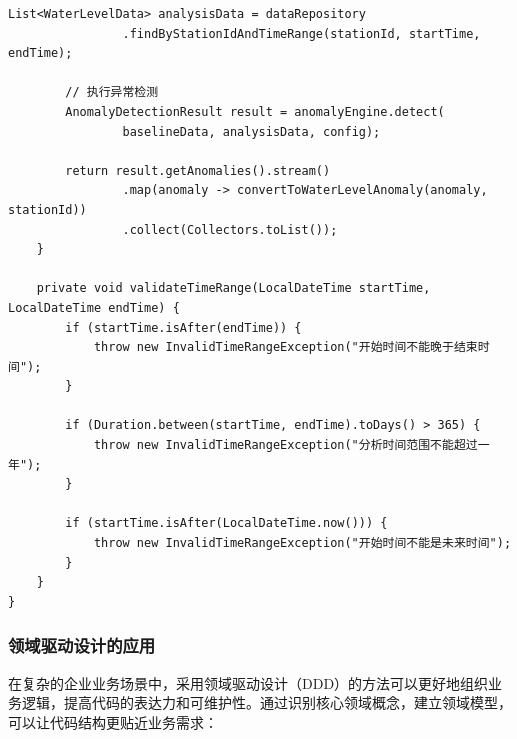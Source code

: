 \begin{lstlisting}[style=java]
        List<WaterLevelData> analysisData = dataRepository
                .findByStationIdAndTimeRange(stationId, startTime, endTime);
        
        // 执行异常检测
        AnomalyDetectionResult result = anomalyEngine.detect(
                baselineData, analysisData, config);
        
        return result.getAnomalies().stream()
                .map(anomaly -> convertToWaterLevelAnomaly(anomaly, stationId))
                .collect(Collectors.toList());
    }
    
    private void validateTimeRange(LocalDateTime startTime, LocalDateTime endTime) {
        if (startTime.isAfter(endTime)) {
            throw new InvalidTimeRangeException("开始时间不能晚于结束时间");
        }
        
        if (Duration.between(startTime, endTime).toDays() > 365) {
            throw new InvalidTimeRangeException("分析时间范围不能超过一年");
        }
        
        if (startTime.isAfter(LocalDateTime.now())) {
            throw new InvalidTimeRangeException("开始时间不能是未来时间");
        }
    }
}
\end{lstlisting}

\hypertarget{ux9886ux57dfux9a71ux52a8ux8bbeux8ba1ux7684ux5e94ux7528}{%
\subsubsection{领域驱动设计的应用}\label{ux9886ux57dfux9a71ux52a8ux8bbeux8ba1ux7684ux5e94ux7528}}

在复杂的企业业务场景中，采用领域驱动设计（DDD）的方法可以更好地组织业务逻辑，提高代码的表达力和可维护性。通过识别核心领域概念，建立领域模型，可以让代码结构更贴近业务需求：

